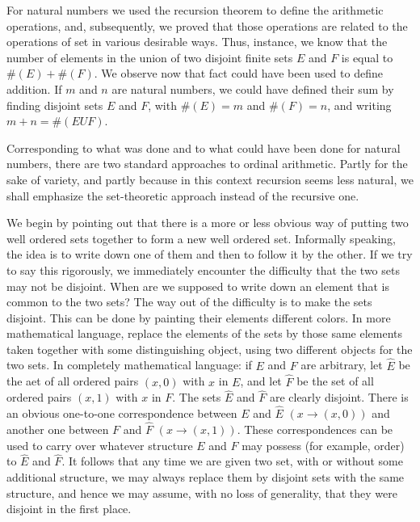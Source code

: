 
For natural numbers we used the recursion theorem to define the arithmetic operations, and, subsequently, we proved that those operations are related to the operations of set in various desirable ways. Thus, instance, we know that the number of elements in the union of two disjoint finite sets $E$ and $F$ is equal to $\# (E) + \# (F)$. We observe now that fact could have been used to define addition. If $m$ and $n$ are natural numbers, we could have defined their sum by finding disjoint sets $E$ and $F$, with $\# (E) = m$ and $\# (F) = n$, and writing $m+ n = \# (E U F)$.

Corresponding to what was done and to what could have been done for natural numbers, there are two standard approaches to ordinal arithmetic. Partly for the sake of variety, and partly because in this context recursion seems less natural, we shall emphasize the set-theoretic approach instead of the recursive one. 

We begin by pointing out that there is a more or less obvious way of putting two well ordered sets together to form a new well  ordered set. Informally speaking, the idea is to write down one of them and then to follow it by the other. If we try to say this rigorously, we immediately encounter the difficulty that the two sets may not be disjoint. When are we supposed to write down an element that is common to the two sets? The way out of the difficulty is to make the sets disjoint. This can be done by painting their elements different colors. In more mathematical language, replace the elements of the sets by those same elements taken together with some distinguishing object, using two different objects for the two sets. In completely mathematical language: if $E$ and $F$ are arbitrary, let $\hat{E}$ be the aet of all ordered pairs $(x, 0)$ with $x$ in $E$, and let $\hat{F}$ be the set of all ordered pairs $(x,1)$ with $x$ in $F$. The sets $\hat{E}$ and $\hat{F}$ are clearly disjoint. There is an obvious one-to-one correspondence between $E$ and $\hat{E}$ $(x \rightarrow (x,0))$ and another one between $F$ and $\hat{F}$ $(x \rightarrow (x,1))$. These correspondences can be used to carry over whatever structure $E$ and $F$ may possess (for example, order) to $\hat{E}$ and $\hat{F}$. It follows that any time we are given two set, with or without some additional structure, we may always replace them by disjoint sets with the same structure, and hence we may assume, with no loss of generality, that they were disjoint in the first place. 

